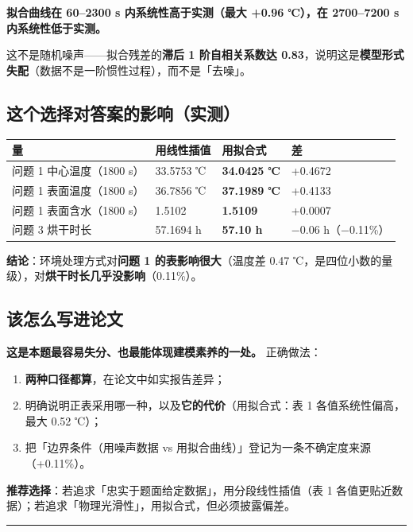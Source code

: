 \textbf{拟合曲线在 60–2300 s 内系统性高于实测（最大 +0.96 ℃），在 2700–7200 s 内系统性低于实测。}


这不是随机噪声——拟合残差的\textbf{滞后 1 阶自相关系数达 0.83}，说明这是\textbf{模型形式失配}（数据不是一阶惯性过程），而不是「去噪」。


\subsection{这个选择对答案的影响（实测）}


\begin{center}
\small
\begin{tabular}{llll}
\toprule
量 & 用线性插值 & 用拟合式 & 差 \\
\midrule
问题 1 中心温度（1800 s） & 33.5753 ℃ & \textbf{34.0425 ℃} & +0.4672 \\
问题 1 表面温度（1800 s） & 36.7856 ℃ & \textbf{37.1989 ℃} & +0.4133 \\
问题 1 表面含水（1800 s） & 1.5102 & \textbf{1.5109} & +0.0007 \\
问题 3 烘干时长 & 57.1694 h & \textbf{57.10 h} & −0.06 h（−0.11\%） \\
\bottomrule
\end{tabular}
\end{center}


\textbf{结论}：环境处理方式对\textbf{问题 1 的表影响很大}（温度差 0.47 ℃，是四位小数的量级），对\textbf{烘干时长几乎没影响}（0.11\%）。


\subsection{该怎么写进论文}


\textbf{这是本题最容易失分、也最能体现建模素养的一处。} 正确做法：


\begin{enumerate}
\item \textbf{两种口径都算}，在论文中如实报告差异；
\item 明确说明正表采用哪一种，以及\textbf{它的代价}（用拟合式：表 1 各值系统性偏高，最大 0.52 ℃）；
\item 把「边界条件（用噪声数据 vs 用拟合曲线）」登记为一条不确定度来源（+0.11\%）。
\end{enumerate}


\textbf{推荐选择}：若追求「忠实于题面给定数据」，用分段线性插值（表 1 各值更贴近数据）；若追求「物理光滑性」，用拟合式，但必须披露偏差。


\vspace{1mm}\hrule\vspace{1mm}


